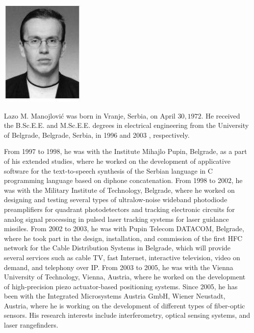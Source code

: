 \documentclass[10pt]{article}
\begin{document}
\includegraphics[max width=\textwidth]{5ecfdecb1168916efbeaf9054b715324-10}

Lazo M. Manojlović was born in Vranje, Serbia, on April \(30,1972 .\) He received the B.Sc.E.E. and M.Sc.E.E. degrees in electrical engineering from the University of Belgrade, Belgrade, Serbia, in 1996 and 2003 , respectively.

From 1997 to 1998, he was with the Institute Mihajlo Pupin, Belgrade, as a part of his extended studies, where he worked on the development of applicative software for the text-to-speech synthesis of the Serbian language in C programming language based on diphone concatenation. From 1998 to 2002, he was with the Military Institute of Technology, Belgrade, where he worked on designing and testing several types of ultralow-noise wideband photodiode preamplifiers for quadrant photodetectors and tracking electronic circuits for analog signal processing in pulsed laser tracking systems for laser guidance missiles. From 2002 to 2003, he was with Pupin Telecom DATACOM, Belgrade, where he took part in the design, installation, and commission of the first HFC network for the Cable Distribution Systems in Belgrade, which will provide several services such as cable TV, fast Internet, interactive television, video on demand, and telephony over IP. From 2003 to 2005, he was with the Vienna University of Technology, Vienna, Austria, where he worked on the development of high-precision piezo actuator-based positioning systems. Since 2005, he has been with the Integrated Microsystems Austria GmbH, Wiener Neustadt, Austria, where he is working on the development of different types of fiber-optic sensors. His research interests include interferometry, optical sensing systems, and laser rangefinders.
\end{document}
